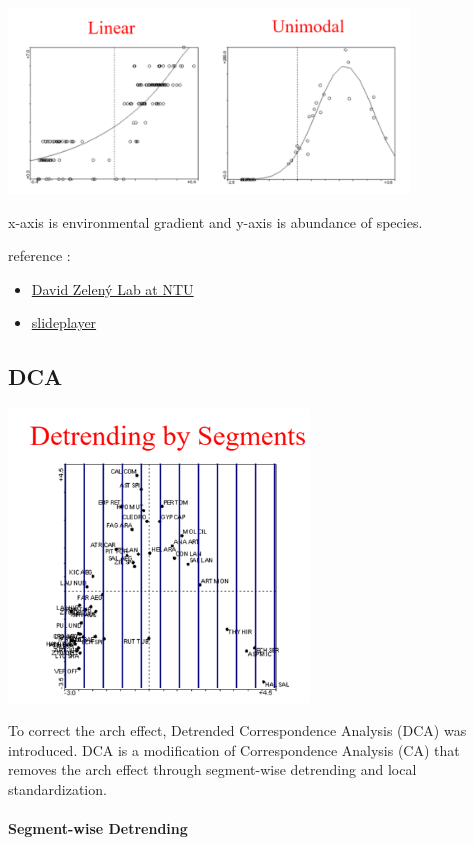 \documentclass[
]{article}
\begin{document}
\includegraphics[width=0.8\textwidth,height=\textheight]{images/Fig12.png}

x-axis is environmental gradient and y-axis is abundance of species.

reference :

\begin{itemize}
\item
  \href{https://www.davidzeleny.net/anadat-r/doku.php/en:ca_dca}{David
  Zelený Lab at NTU}
\item
  \href{https://slideplayer.com/slide/776318/}{slideplayer}
\end{itemize}

\hypertarget{dca}{%
\subsection{DCA}\label{dca}}

\includegraphics[width=0.6\textwidth,height=\textheight]{images/Fig13.png}

To correct the arch effect, Detrended Correspondence Analysis (DCA) was
introduced. DCA is a modification of Correspondence Analysis (CA) that
removes the arch effect through segment-wise detrending and local
standardization.

\hypertarget{segment-wise-detrending}{%
\paragraph{Segment-wise Detrending}\label{segment-wise-detrending}}
\end{document}
